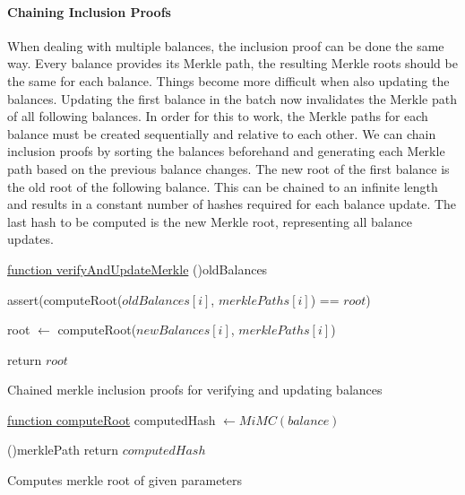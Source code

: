 \documentclass[../../thesis.tex]{subfiles}
\begin{document}
\paragraph{Chaining Inclusion Proofs} \label{chain_inclusion}
When dealing with multiple balances, the inclusion proof can be done the same way. Every balance provides its Merkle path, the resulting Merkle roots should be the same for each balance. Things become more difficult when also updating the balances. Updating the first balance in the batch now invalidates the Merkle path of all following balances. In order for this to work, the Merkle paths for each balance must be created sequentially and relative to each other. We can chain inclusion proofs by sorting the balances beforehand and generating each Merkle path based on the previous balance changes. The new root of the first balance is the old root of the following balance. This can be chained to an infinite length and results in a constant number of hashes required for each balance update. The last hash to be computed is the new Merkle root, representing all balance updates.


\begin{algorithm}

    \underline{function verifyAndUpdateMerkle}\;
    \ForEach(){oldBalances}
    {
        assert(computeRoot($oldBalances[i]$, $merklePaths[i]$) == $root$)

        root $\gets$ computeRoot($newBalances[i]$, $merklePaths[i]$)
    }

    return $root$

    \caption{Chained merkle inclusion proofs for verifying and updating balances}
\end{algorithm}

\begin{algorithm}

    \underline{function computeRoot}\;
    computedHash $\gets MiMC(balance)$

    \ForEach(){merklePath}
    {
    }
    return $computedHash$
    \caption{Computes merkle root of given parameters}
\end{algorithm}
\end{document}
